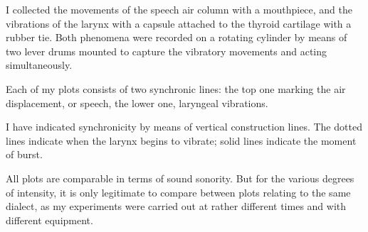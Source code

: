 \documentclass[output=paper]{langscibook}
\begin{document}
I collected the movements of the speech air column with a mouthpiece, and the vibrations of the larynx with a capsule attached to the thyroid cartilage with a rubber tie. Both phenomena were recorded on a rotating cylinder by means of two lever drums mounted to capture the vibratory movements and acting simultaneously.

Each of my plots   consists of two synchronic lines: the top one marking the air displacement, or speech, the lower one, laryngeal vibrations.

I have indicated synchronicity by means of vertical construction lines. The dotted lines indicate when the larynx begins to vibrate; solid lines indicate the moment of burst.

All plots are comparable in terms of sound sonority. But for the various degrees of intensity, it is only legitimate to compare between plots relating to the same dialect, as my experiments were carried out at rather different times and with different equipment.



\end{document}
